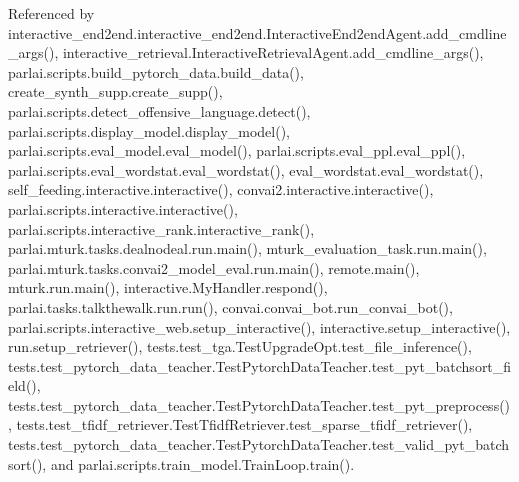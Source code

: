 Referenced by interactive\+\_\+end2end.\+interactive\+\_\+end2end.\+Interactive\+End2end\+Agent.\+add\+\_\+cmdline\+\_\+args(), interactive\+\_\+retrieval.\+Interactive\+Retrieval\+Agent.\+add\+\_\+cmdline\+\_\+args(), parlai.\+scripts.\+build\+\_\+pytorch\+\_\+data.\+build\+\_\+data(), create\+\_\+synth\+\_\+supp.\+create\+\_\+supp(), parlai.\+scripts.\+detect\+\_\+offensive\+\_\+language.\+detect(), parlai.\+scripts.\+display\+\_\+model.\+display\+\_\+model(), parlai.\+scripts.\+eval\+\_\+model.\+eval\+\_\+model(), parlai.\+scripts.\+eval\+\_\+ppl.\+eval\+\_\+ppl(), parlai.\+scripts.\+eval\+\_\+wordstat.\+eval\+\_\+wordstat(), eval\+\_\+wordstat.\+eval\+\_\+wordstat(), self\+\_\+feeding.\+interactive.\+interactive(), convai2.\+interactive.\+interactive(), parlai.\+scripts.\+interactive.\+interactive(), parlai.\+scripts.\+interactive\+\_\+rank.\+interactive\+\_\+rank(), parlai.\+mturk.\+tasks.\+dealnodeal.\+run.\+main(), mturk\+\_\+evaluation\+\_\+task.\+run.\+main(), parlai.\+mturk.\+tasks.\+convai2\+\_\+model\+\_\+eval.\+run.\+main(), remote.\+main(), mturk.\+run.\+main(), interactive.\+My\+Handler.\+respond(), parlai.\+tasks.\+talkthewalk.\+run.\+run(), convai.\+convai\+\_\+bot.\+run\+\_\+convai\+\_\+bot(), parlai.\+scripts.\+interactive\+\_\+web.\+setup\+\_\+interactive(), interactive.\+setup\+\_\+interactive(), run.\+setup\+\_\+retriever(), tests.\+test\+\_\+tga.\+Test\+Upgrade\+Opt.\+test\+\_\+file\+\_\+inference(), tests.\+test\+\_\+pytorch\+\_\+data\+\_\+teacher.\+Test\+Pytorch\+Data\+Teacher.\+test\+\_\+pyt\+\_\+batchsort\+\_\+field(), tests.\+test\+\_\+pytorch\+\_\+data\+\_\+teacher.\+Test\+Pytorch\+Data\+Teacher.\+test\+\_\+pyt\+\_\+preprocess(), tests.\+test\+\_\+tfidf\+\_\+retriever.\+Test\+Tfidf\+Retriever.\+test\+\_\+sparse\+\_\+tfidf\+\_\+retriever(), tests.\+test\+\_\+pytorch\+\_\+data\+\_\+teacher.\+Test\+Pytorch\+Data\+Teacher.\+test\+\_\+valid\+\_\+pyt\+\_\+batchsort(), and parlai.\+scripts.\+train\+\_\+model.\+Train\+Loop.\+train().

